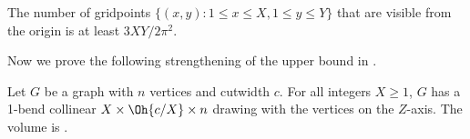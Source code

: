 \documentclass[10pt,twocolumn]{article}
\begin{document}
\begin{lemma}
The number of gridpoints $\{(x,y):1\leq x\leq X,1\leq y\leq Y\}$ that are
visible from the origin is at least $3XY/2\pi^2$.
\end{lemma}




Now we prove the following strengthening of the upper bound in
.

\begin{lemma}
Let $G$ be a graph with $n$ vertices and cutwidth $c$. 
For all integers
$X\geq1$, $G$ has a 1-bend collinear  $X\times\Oh{c/X}\times n$
drawing with the vertices on the $Z$-axis. The volume is .
\end{lemma}
\end{document}
